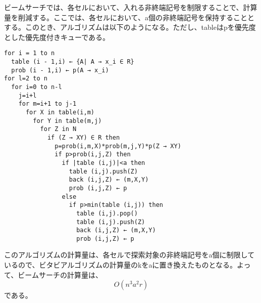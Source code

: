 \documentclass[a4paper,11pt]{ltjsarticle}
\begin{document}
ビームサーチでは、各セルにおいて、入れる非終端記号を制限することで、計算量を削減する。ここでは、各セルにおいて、a個の非終端記号を保持することとする。このとき、アルゴリズムは以下のようになる。ただし、tableはpを優先度とした優先度付きキューである。
\begin{verbatim}
for i = 1 to n
  table (i - 1,i) ← {A| A → x_i ∈ R}
  prob (i - 1,i) ← p(A → x_i)
for l=2 to n
  for i=0 to n-l
    j=i+l
    for m=i+1 to j-1
      for X in table(i,m)
        for Y in table(m,j)
          for Z in N
            if (Z → XY) ∈ R then
              p=prob(i,m,X)*prob(m,j,Y)*p(Z → XY)
              if p>prob(i,j,Z) then
                if |table (i,j)|<a then
                  table (i,j).push(Z)
                  back (i,j,Z) ← (m,X,Y)
                  prob (i,j,Z) ← p
                else
                  if p>min(table (i,j)) then
                    table (i,j).pop()
                    table (i,j).push(Z)
                    back (i,j,Z) ← (m,X,Y)
                    prob (i,j,Z) ← p
\end{verbatim}

このアルゴリズムの計算量は、各セルで探索対象の非終端記号をa個に制限しているので、ビタビアルゴリズムの計算量のkをaに置き換えたものとなる。よって、ビームサーチの計算量は、
\begin{equation*}
  O(n^3a^2r)
\end{equation*}
である。
\end{document}
